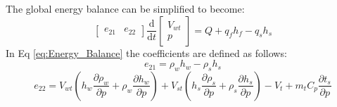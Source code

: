         The global energy balance can be simplified to become:\cite{Astrom}
        \begin{equation}
            \label{eq:Energy_Balance}
            \left [ \begin{matrix} e_{21}& e_{22}\end{matrix} \right ] \frac{\mathrm{d} }{\mathrm{d} t} \left [ \begin{matrix} V_{wt}\\ p\end{matrix} \right ] = Q + q_f h_f  - q_s h_s 
        \end{equation}
        In Eq \ref{eq:Energy_Balance} the coefficients are defined as follows:
        \begin{equation*}
            e_{21} = \rho_w h_w - \rho_s h_s 
        \end{equation*}
        \begin{equation*}
            e_{22} = V_{wt} \left ( h_w  \frac{\partial \rho_w }{\partial p} + \rho_w \frac{\partial h_w }{\partial p}\right ) + V_{st} \left ( h_s  \frac{\partial \rho_s }{\partial p} + \rho_s \frac{\partial h_s }{\partial p}\right ) - V_{t} + m_t C_p \frac{\partial t_s }{\partial p}
        \end{equation*}
        
        
